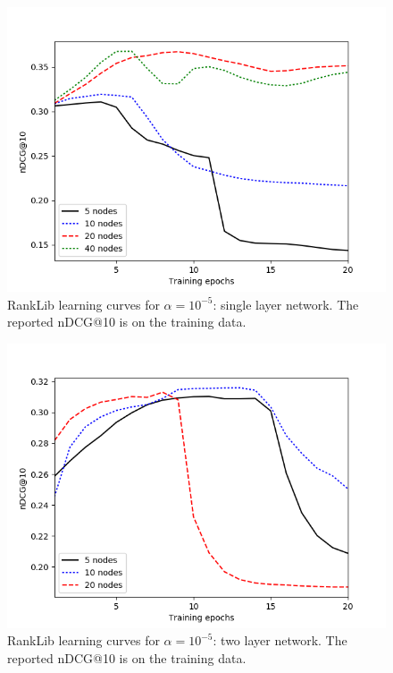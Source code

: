 \documentclass[english]{article}
\theoremstyle{definition}
\begin{document}
\begin{multicols}{2}
\begin{figure}[H]
\includegraphics[width=\linewidth]{figures/RankNet_1_layer_training.png}
\caption{RankLib learning curves for $\alpha=10^{-5}$: single layer network.  The reported nDCG@10 is on the training data.} \label{fig:RankNet_1_lc}
\end{figure}

\begin{figure}[H]
\includegraphics[width=\linewidth]{figures/RankNet_2_layer_training.png}
\caption{RankLib learning curves for $\alpha=10^{-5}$: two layer network.  The reported nDCG@10 is on the training data.} \label{fig:RankNet_2_lc}
\label{RankLib_lc}
\end{figure}


\end{multicols}
\end{document}
